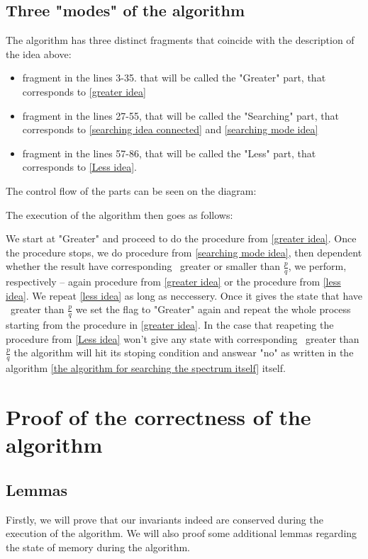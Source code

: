 \subsection{Three "modes" of the algorithm}
The algorithm has three distinct fragments that coincide with 
the description of the idea above: 
\begin{itemize}
\item fragment in the lines 3-35. that will be called the "Greater" part, 
that corresponds to \ref{greater idea}
\item fragment in the lines 27-55, that will be called the "Searching" part, 
that corresponds to \ref{searching idea connected} and \ref{searching mode idea}
\item fragment in the lines 57-86, that will be called the "Less" part, that 
corresponds to \ref{Less idea}.
\end{itemize}

The control flow of the parts can be seen on the diagram:

The execution of the algorithm then goes as follows:

We start at "Greater" and proceed to do the procedure from \ref{greater idea}. 
Once the procedure stops, we do procedure from \ref{searching mode idea}, then 
dependent whether the result have corresponding \Eoc\ greater or smaller than $\frac{p}{q}$, 
we perform, respectively -- again procedure from \ref{greater idea} or the 
procedure from \ref{less idea}. We repeat \ref{less idea} as long as neccessery. 
Once it gives the state that have \Eoc\ greater than $\frac{p}{q}$ we set the flag to 
"Greater" again and repeat the whole process starting from the procedure in \ref{greater idea}. 
In the case that reapeting the procedure from \ref{Less idea} won't give any state with 
corresponding \Eoc\ greater than $\frac{p}{q}$ the algorithm will hit its stoping condition 
and answear "no" as written in the algorithm 
\ref{the algorithm for searching the spectrum itself} itself.   
\section{Proof of the correctness of the algorithm}\label{memory state proof}
\subsection{Lemmas}
Firstly, we will prove that our invariants indeed are conserved during the execution 
of the algorithm. We will also proof some additional lemmas regarding the state of memory 
during the algorithm.

